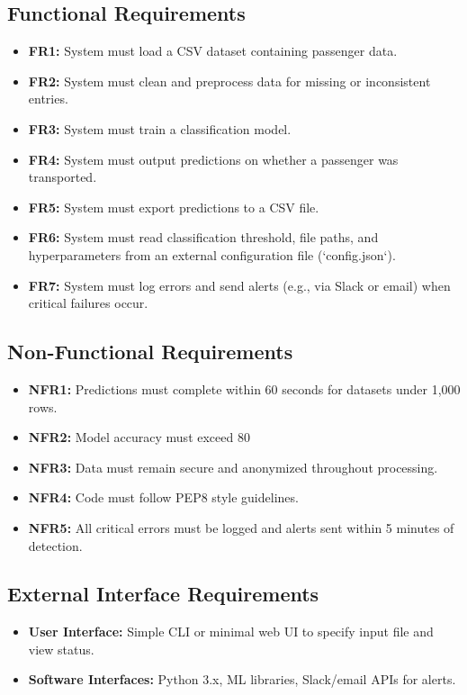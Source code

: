 \documentclass[15pt]{article}
\begin{document}
\subsection{Functional Requirements}
\begin{itemize}
  \item \textbf{FR1:} System must load a CSV dataset containing passenger data.
  \item \textbf{FR2:} System must clean and preprocess data for missing or inconsistent entries.
  \item \textbf{FR3:} System must train a classification model.
  \item \textbf{FR4:} System must output predictions on whether a passenger was transported.
  \item \textbf{FR5:} System must export predictions to a CSV file.
  \item \textbf{FR6:} System must read classification threshold, file paths, and hyperparameters from an external configuration file (`config.json`).
  \item \textbf{FR7:} System must log errors and send alerts (e.g., via Slack or email) when critical failures occur.
\end{itemize}

\subsection{Non-Functional Requirements}
\begin{itemize}
  \item \textbf{NFR1:} Predictions must complete within 60 seconds for datasets under 1,000 rows.
  \item \textbf{NFR2:} Model accuracy must exceed 80 %
  \item \textbf{NFR3:} Data must remain secure and anonymized throughout processing.
  \item \textbf{NFR4:} Code must follow PEP8 style guidelines.
  \item \textbf{NFR5:} All critical errors must be logged and alerts sent within 5 minutes of detection.
\end{itemize}

\subsection{External Interface Requirements}
\begin{itemize}
  \item \textbf{User Interface:} Simple CLI or minimal web UI to specify input file and view status.
  \item \textbf{Software Interfaces:} Python 3.x, ML libraries, Slack/email APIs for alerts.
\end{itemize}
\end{document}
